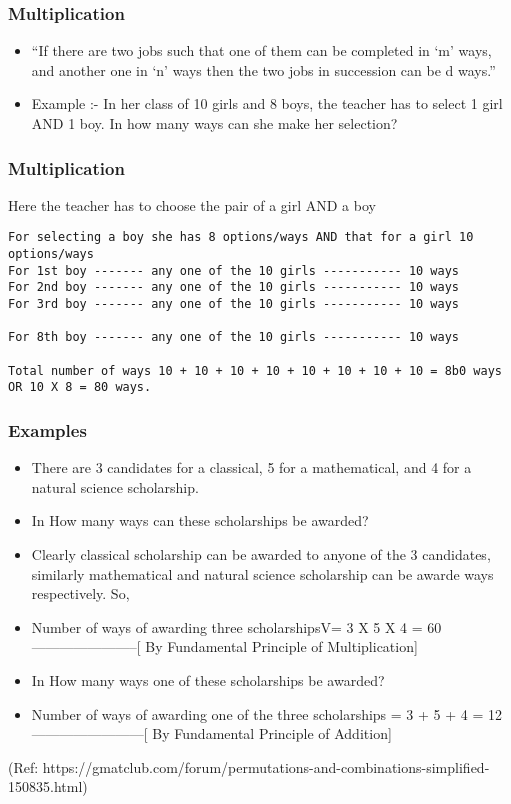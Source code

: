 \begin{frame}[fragile]\frametitle{Multiplication}
\begin{itemize}
\item ``If there are two jobs such that one of them can be completed in `m' ways, and another one in ‘n’ ways then the two jobs in succession can be d
ways.''
 \item Example :- In her class of 10 girls and 8 boys, the teacher has to select 1 girl AND 1 boy. In how many ways can she make her selection?
 \end{itemize}
\end{frame}

\begin{frame}[fragile]\frametitle{Multiplication}
Here the teacher has to choose the pair of a girl AND a boy
\begin{lstlisting}
For selecting a boy she has 8 options/ways AND that for a girl 10 options/ways 
For 1st boy ------- any one of the 10 girls ----------- 10 ways
For 2nd boy ------- any one of the 10 girls ----------- 10 ways
For 3rd boy ------- any one of the 10 girls ----------- 10 ways

For 8th boy ------- any one of the 10 girls ----------- 10 ways
 
Total number of ways 10 + 10 + 10 + 10 + 10 + 10 + 10 + 10 = 8b0 ways OR 10 X 8 = 80 ways.
\end{lstlisting}
\end{frame}

\begin{frame}[fragile]\frametitle{Examples}
\begin{itemize}
\item There are 3 candidates for a classical, 5 for a mathematical, and 4 for a natural science scholarship.
 
\item In How many ways can these scholarships be awarded?
 \item  Clearly classical scholarship can be awarded to anyone of the 3 candidates, similarly mathematical and natural science scholarship can be awarde
ways respectively. So,
 \item  Number of ways of awarding three scholarshipsV= 3 X 5 X 4 = 60 -----------------------[ By Fundamental Principle of Multiplication]
\item In How many ways one of these scholarships be awarded?
 \item 
Number of ways of awarding one of the three scholarships = 3 + 5 + 4 = 12------------------------[ By Fundamental Principle of Addition]
 \end{itemize}
 
 (Ref: https://gmatclub.com/forum/permutations-and-combinations-simplified-150835.html)
\end{frame}

